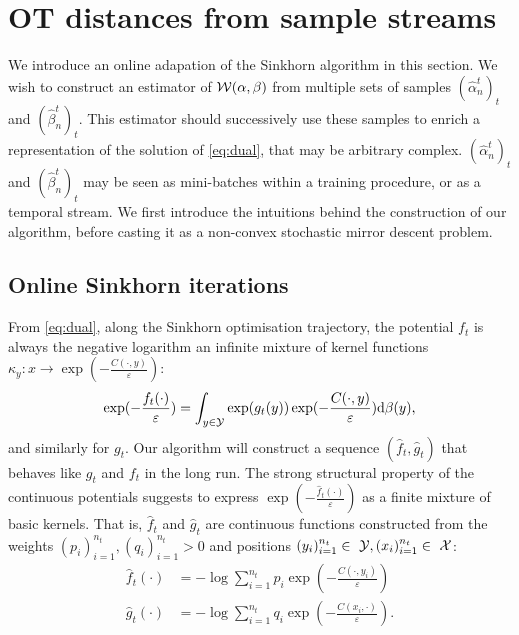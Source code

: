 
\section{OT distances from sample streams}

We introduce an online adapation of the Sinkhorn algorithm in this section. We
wish to construct an estimator of $\mathcal{W}(\alpha,\beta)$ from multiple sets of
samples $(\hat \alpha_n^t)_t$ and $(\hat \beta_n^t)_t$. This estimator should
successively use these samples to enrich a representation of the solution of
\eqref{eq:dual}, that may be arbitrary complex. $(\hat \alpha_n^t)_t$ and $(\hat
\beta_n^t)_t$ may be seen as mini-batches within a training procedure, or as a
temporal stream. We first introduce the intuitions behind the construction of
our algorithm, before casting it as a non-convex stochastic mirror descent
problem.

\subsection{Online Sinkhorn iterations}

From \eqref{eq:dual}, along the Sinkhorn optimisation trajectory, the potential $f_t$ is always the negative logarithm an
infinite mixture of kernel functions $\kappa_y: x \to \exp(-\frac{C(\cdot, y)}{\varepsilon})$:
\begin{equation}
    \exp(-\frac{f_t(\cdot)}{\varepsilon}) = 
    \int_{y \in \mathcal{Y}} \exp(g_t(y))  \exp(-\frac{C(\cdot, y)}{\varepsilon}) \textrm{d} \beta(y),
\end{equation}
and similarly for $g_t$. Our algorithm will construct a sequence $(\hat f_t,
\hat g_t)$ that behaves like $g_t$ and $f_t$ in the long run. The strong
structural property of the continuous potentials suggests to express $\exp(-\frac{\hat f_t(\cdot)}{\varepsilon})$ as a
finite mixture of basic kernels. That is, $\hat f_t$ and $\hat g_t$ are continuous
functions constructed from the weights $(p_i)_{i=1}^{n_t}, (q_i)_{i=1}^{n_t} > 0$ and positions
$(y_i)_{i=1}^{n_t} \in~\mathcal{Y}, (x_i)_{i=1}^{n_t} \in~\mathcal{X}$:
\begin{align}
    \hat f_t(\cdot) &= - \log \sum_{i=1}^{n_t} 
    p_i \exp(-\frac{C(\cdot, y_i)}{\varepsilon}) \\
    \hat g_t(\cdot) &= - \log \sum_{i=1}^{n_t} 
    q_i \exp(-\frac{C(x_i, \cdot)}{\varepsilon}).
\end{align}



